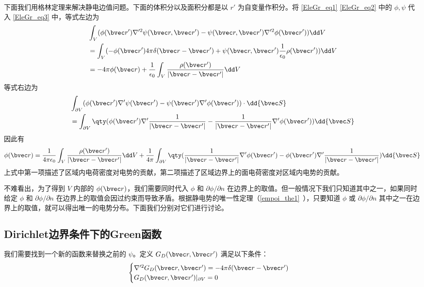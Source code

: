 下面我们用格林定理来解决静电边值问题。下面的体积分以及面积分都是以 $r'$ 为自变量作积分。将 \autoref{EleGr_eq1} \autoref{EleGr_eq2} 中的 $\phi,\psi$ 代入 \autoref{EleGr_eq3}  中，等式左边为
\begin{equation}
\begin{aligned}
&\int_V(\phi(\bvec r')\nabla'^2\psi(\bvec r,\bvec r')-\psi(\bvec r,\bvec r')\nabla'^2\phi(\bvec r'))\dd V
\\
&=\int_V(-\phi(\bvec r')4\pi \delta(\bvec r-\bvec r')+\psi(\bvec r,\bvec r')\frac{1}{\epsilon_0}\rho(\bvec r'))\dd V\\
&=-4\pi\phi(\bvec r)+\frac{1}{\epsilon_0}\int_V\frac{\rho(\bvec r')}{|\bvec r-\bvec r'|}\dd V
\end{aligned}
\end{equation}
等式右边为
\begin{equation}
\begin{aligned}
&\int_{\partial V}(\phi(\bvec r')\nabla'\psi(\bvec r')-\psi(\bvec r')\nabla'\phi(\bvec r'))\cdot \dd {\bvec S}\\
&=\int_{\partial V}\qty(\phi(\bvec r')\nabla'\frac{1}{|\bvec r-\bvec r'|}-\frac{1}{|\bvec r-\bvec r'|}\nabla'\phi(\bvec r'))\dd {\bvec S}
\end{aligned}
\end{equation}
因此有
\begin{equation}
\phi(\bvec r)=\frac{1}{4\pi\epsilon_0}\int_V\frac{\rho(\bvec r')}{|\bvec r-\bvec r'|}\dd V+\frac{1}{4\pi}\int_{\partial V}\qty(\frac{1}{|\bvec r-\bvec r'|}\nabla'\phi(\bvec r')-\phi(\bvec r')\nabla'\frac{1}{|\bvec r-\bvec r'|})\dd {\bvec S}
\end{equation}
上式中第一项描述了区域内电荷密度对电势的贡献，第二项描述了区域边界上的面电荷密度对区域内电势的贡献。

不难看出，为了得到 $V$ 内部的 $\phi(\bvec r)$，我们需要同时代入 $\phi$ 和 $\partial \phi/\partial n$ 在边界上的取值。但一般情况下我们只知道其中之一，如果同时给定 $\phi$ 和 $\partial \phi/\partial n$ 在边界上的取值会因过约束而导致矛盾。根据静电势的唯一性定理（\autoref{empoi_the1}~），只要知道 $\phi$ 或 $\partial \phi/\partial n$ 其中之一在边界上的取值，就可以得出唯一的电势分布。下面我们分别对它们进行讨论。

\subsection{Dirichlet边界条件下的Green函数}

我们需要找到一个新的函数来替换之前的 $\psi$。定义 $G_D(\bvec r,\bvec r')$ 满足以下条件：
\begin{equation}\label{EleGr_eq6}
\begin{cases}
\nabla'^2G_D(\bvec r,\bvec r')=-4\pi\delta(\bvec r-\bvec r')\\
G_D(\bvec r,\bvec r')|_{\partial V}=0
\end{cases}
\end{equation}

